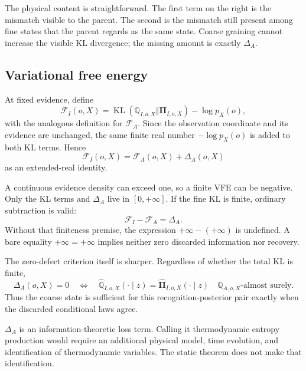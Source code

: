 \documentclass[11pt,letterpaper]{article}
\newcommand{\KL}{\operatorname{KL}}
\newcommand{\Rec}{\mathbb Q}
\newcommand{\Post}{\boldsymbol\Pi}
\begin{document}
The physical content is straightforward. The first term on the right is the mismatch visible to the parent. The second is the mismatch still present among fine states that the parent regards as the same state. Coarse graining cannot increase the visible KL divergence; the missing amount is exactly \(\Delta_A\).

\subsection{Variational free energy}

At fixed evidence, define
\begin{equation}
  \mathcal F_I(o,X)
  =
  \KL(\Rec_{I,o,X}\Vert\Post_{I,o,X})
  -\log p_X(o),
  \label{eq:fine-vfe}
\end{equation}
with the analogous definition for \(\mathcal F_A\). Since the observation coordinate and its evidence are unchanged, the same finite real number \(-\log p_X(o)\) is added to both KL terms. Hence
\begin{equation}
  \mathcal F_I(o,X)
  =
  \mathcal F_A(o,X)+\Delta_A(o,X)
  \label{eq:vfe-chain}
\end{equation}
as an extended-real identity.

A continuous evidence density can exceed one, so a finite VFE can be negative. Only the KL terms and \(\Delta_A\) live in \([0,+\infty]\). If the fine KL is finite, ordinary subtraction is valid:
\[
  \mathcal F_I-\mathcal F_A=\Delta_A.
\]
Without that finiteness premise, the expression \(+\infty-(+\infty)\) is undefined. A bare equality \(+\infty=+\infty\) implies neither zero discarded information nor recovery.

The zero-defect criterion itself is sharper. Regardless of whether the total KL is finite,
\begin{equation}
  \Delta_A(o,X)=0
  \quad\Longleftrightarrow\quad
  \widehat{\Rec}_{I,o,X}(\cdot\mid z)
  =
  \widehat{\Post}_{I,o,X}(\cdot\mid z)
  \quad
  \Rec_{A,o,X}\text{-almost surely}.
  \label{eq:zero-defect}
\end{equation}
Thus the coarse state is sufficient for this recognition-posterior pair exactly when the discarded conditional laws agree.

\begin{boundarybox}
\(\Delta_A\) is an information-theoretic loss term. Calling it thermodynamic entropy production would require an additional physical model, time evolution, and identification of thermodynamic variables. The static theorem does not make that identification.
\end{boundarybox}
\end{document}
